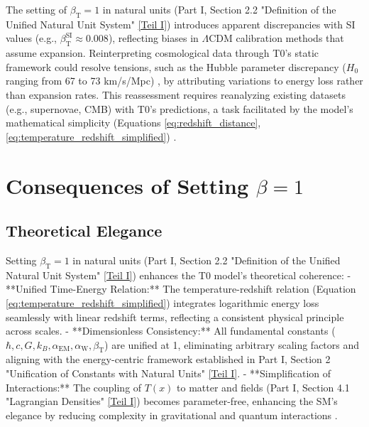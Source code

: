 \documentclass[12pt,a4paper]{article}
\newcommand{\Tfield}{T(x)}
\newcommand{\alphaEM}{\alpha_{\text{EM}}}
\newcommand{\alphaW}{\alpha_{\text{W}}}
\newcommand{\betaT}{\beta_{\text{T}}}
\begin{document}
	The setting of \(\betaT = 1\) in natural units (Part I, Section 2.2 "Definition of the Unified Natural Unit System" \href{https://github.com/jpascher/T0-Time-Mass-Duality/tree/main/2/pdf/English/QMRelTimeMassPart1En.pdf}{[Teil I]}) introduces apparent discrepancies with SI values (e.g., \(\betaT^{\text{SI}} \approx 0.008\)), reflecting biases in \(\Lambda\)CDM calibration methods that assume expansion. Reinterpreting cosmological data through T0’s static framework could resolve tensions, such as the Hubble parameter discrepancy (\(H_0\) ranging from 67 to 73 km/s/Mpc) \cite{DiValentino2021}, by attributing variations to energy loss rather than expansion rates. This reassessment requires reanalyzing existing datasets (e.g., supernovae, CMB) with T0’s predictions, a task facilitated by the model’s mathematical simplicity (Equations \ref{eq:redshift_distance}, \ref{eq:temperature_redshift_simplified}) \cite{pascher_alphabeta_2025}.
	
	\section{Consequences of Setting \(\beta = 1\)}
	\label{sec:consequences_beta}
	
	\subsection{Theoretical Elegance}
	\label{subsec:theoretical_elegance}
	
	Setting \(\betaT = 1\) in natural units (Part I, Section 2.2 "Definition of the Unified Natural Unit System" \href{https://github.com/jpascher/T0-Time-Mass-Duality/tree/main/2/pdf/English/QMRelTimeMassPart1En.pdf}{[Teil I]}) enhances the T0 model’s theoretical coherence:
	- **Unified Time-Energy Relation:** The temperature-redshift relation (Equation \ref{eq:temperature_redshift_simplified}) integrates logarithmic energy loss seamlessly with linear redshift terms, reflecting a consistent physical principle across scales.
	- **Dimensionless Consistency:** All fundamental constants (\(\hbar, c, G, k_B, \alphaEM, \alphaW, \betaT\)) are unified at 1, eliminating arbitrary scaling factors and aligning with the energy-centric framework established in Part I, Section 2 "Unification of Constants with Natural Units" \href{https://github.com/jpascher/T0-Time-Mass-Duality/tree/main/2/pdf/English/QMRelTimeMassPart1En.pdf}{[Teil I]}.
	- **Simplification of Interactions:** The coupling of \(\Tfield\) to matter and fields (Part I, Section 4.1 "Lagrangian Densities" \href{https://github.com/jpascher/T0-Time-Mass-Duality/tree/main/2/pdf/English/QMRelTimeMassPart1En.pdf}{[Teil I]}) becomes parameter-free, enhancing the SM’s elegance by reducing complexity in gravitational and quantum interactions \cite{pascher_alphabeta_2025}.
	
\end{document}

